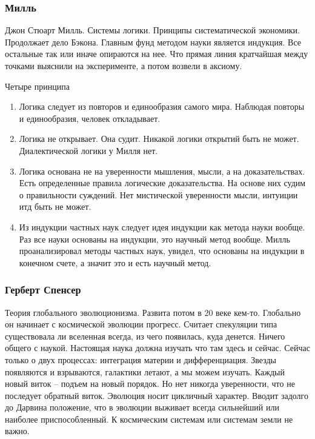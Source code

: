 \documentclass[a4paper, 12pt]{article}
\begin{document}
\subsubsection{Милль}

Джон Стюарт Милль. Системы логики. Принципы систематической экономики. 
Продолжает дело Бэкона. Главным фунд методом науки является индукция. 
Все остальные так или иначе опираются на нее. Что прямая линия 
кратчайшая между точками выяснили на эксперименте, а потом возвели 
в аксиому.

Четыре принципа
\begin{enumerate}
  \item Логика следует из повторов и единообразия самого мира. Наблюдая 
    повторы и единообразия, человек откладывает.
  \item Логика не открывает. Она судит. Никакой логики открытий быть не 
    может. Диалектической логики у Милля нет.
  \item Логика основана не на уверенности мышления, мысли, а на 
    доказательствах. Есть определенные правила логические 
    доказательства. На основе них судим о правильности суждений. Нет 
    мистической уверенности мысли, интуиции итд быть не может.
  \item Из индукции частных наук следует идея индукции как метода науки 
    вообще. Раз все науки основаны на индукции, это научный метод 
    вообще. Милль проанализировал методы частных наук, увидел, что 
    основаны на индукции в конечном счете, а значит это и есть научный 
    метод.
\end{enumerate}

\subsubsection{Герберт Спенсер}

Теория глобального эволюционизма. Развита потом в 20 веке кем-то. 
Глобально он начинает с космической эволюции прогресс. Считает 
спекуляции типа существовала ли вселенная всегда, из чего появилась, 
куда денется. Ничего общего с наукой. Настоящая наука должна изучать что 
там здесь и сейчас. Сейчас только о двух процессах: интеграция материи 
и дифференциация. Звезды появляются и взрываются, галактики летают, а мы 
можем изучать. Каждый новый виток -- подъем на новый порядок. Но нет 
никогда уверенности, что не последует обратный виток. Эволюция носит 
цикличный характер. Вводит задолго до Дарвина положение, что в эволюции 
выживает всегда сильнейший или наиболее приспособленный. К космическим 
системам или системам земли не важно.
\end{document}
